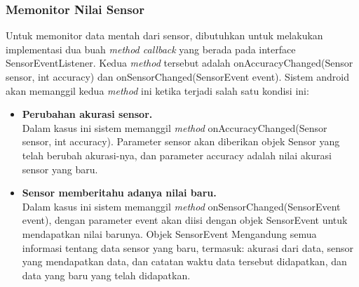 \subsubsection{Memonitor Nilai Sensor}
\label{sssec:memonitor_nilai_sensor}

Untuk memonitor data mentah dari sensor, dibutuhkan untuk melakukan implementasi dua buah \textit{method callback} yang berada pada interface SensorEventListener. Kedua \textit{method} tersebut adalah onAccuracyChanged(Sensor sensor, int accuracy) dan onSensorChanged(SensorEvent event). Sistem android akan memanggil kedua \textit{method} ini ketika terjadi salah satu kondisi ini:

\begin{itemize}
	\item \textbf{Perubahan akurasi sensor.}\\
Dalam kasus ini sistem memanggil \textit{method} onAccuracyChanged(Sensor sensor, int accuracy). Parameter sensor akan diberikan objek Sensor yang telah berubah akurasi-nya, dan parameter accuracy adalah nilai akurasi sensor yang baru.
	\item \textbf{Sensor memberitahu adanya nilai baru.}\\
Dalam kasus ini sistem memanggil \textit{method} onSensorChanged(SensorEvent event), dengan parameter event akan diisi dengan objek SensorEvent untuk mendapatkan nilai barunya. Objek SensorEvent Mengandung semua informasi tentang data sensor yang baru, termasuk: akurasi dari data, sensor yang mendapatkan data, dan catatan waktu data tersebut didapatkan, dan data yang baru yang telah didapatkan.
\end{itemize}


